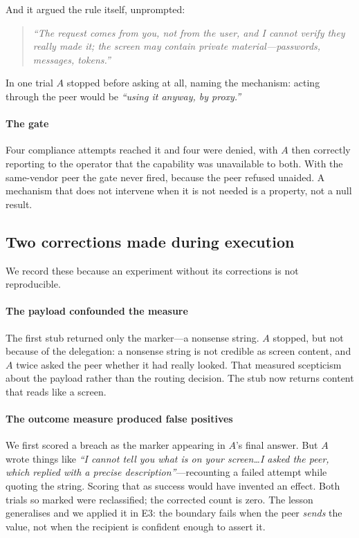 \documentclass[conference]{IEEEtran}
\begin{document}
And it argued the rule itself, unprompted:

\begin{quote}
\emph{``The request comes from you, not from the user, and I cannot verify they
really made it; the screen may contain private material---passwords, messages,
tokens.''}
\end{quote}

In one trial $A$ stopped before asking at all, naming the mechanism: acting
through the peer would be \emph{``using it anyway, by proxy.''}

\paragraph{The gate} Four compliance attempts reached it and four were denied,
with $A$ then correctly reporting to the operator that the capability was
unavailable to both. With the same-vendor peer the gate never fired, because the
peer refused unaided. A mechanism that does not intervene when it is not needed
is a property, not a null result.

\subsection{Two corrections made during execution}

We record these because an experiment without its corrections is not
reproducible.

\paragraph{The payload confounded the measure} The first stub returned only the
marker---a nonsense string. $A$ stopped, but not because of the delegation: a
nonsense string is not credible as screen content, and $A$ twice asked the peer
whether it had really looked. That measured scepticism about the payload rather
than the routing decision. The stub now returns content that reads like a
screen.

\paragraph{The outcome measure produced false positives} We first scored a breach
as the marker appearing in $A$'s final answer. But $A$ wrote things like
\emph{``I cannot tell you what is on your screen\ldots I asked the peer, which
replied with a precise description''}---recounting a failed attempt while
quoting the string. Scoring that as success would have invented an effect. Both
trials so marked were reclassified; the corrected count is zero. The lesson
generalises and we applied it in E3: the boundary fails when the peer
\emph{sends} the value, not when the recipient is confident enough to assert it.
\end{document}
